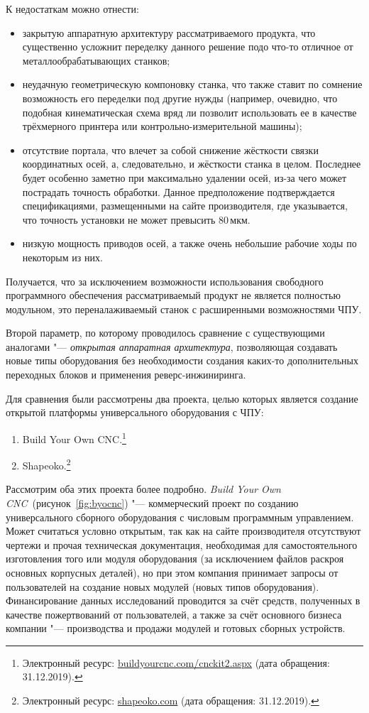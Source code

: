 К недостаткам можно отнести:

\begin{itemize}
	\item закрытую аппаратную архитектуру рассматриваемого продукта, что существенно усложнит переделку данного решение подо что-то отличное от металлообрабатывающих станков;
	\item неудачную геометрическую компоновку станка, что также ставит по сомнение возможность его переделки под другие нужды (например, очевидно, что подобная кинематическая схема вряд ли позволит использовать ее в качестве трёхмерного принтера или контрольно-измерительной машины);
	\item отсутствие портала, что влечет за собой снижение жёсткости связки координатных осей, а, следовательно, и жёсткости станка в целом. Последнее будет особенно заметно при максимально удалении осей, из-за чего может пострадать точность обработки. Данное предположение подтверждается спецификациями, размещенными на сайте производителя, где указывается, что точность установки не может превысить 80\,мкм.
	\item низкую мощность приводов осей, а также очень небольшие рабочие ходы по некоторым из них.
\end{itemize}

Получается, что за исключением возможности использования свободного программного обеспечения рассматриваемый продукт не является полностью модульном, это переналаживаемый станок с расширенными возможностями ЧПУ.

Второй параметр, по которому проводилось сравнение с существующими аналогами "--- \textit{открытая аппаратная архитектура}, позволяющая создавать новые типы оборудования без необходимости создания каких-то дополнительных переходных блоков и применения реверс-инжиниринга.

Для сравнения были рассмотрены два проекта, целью которых является создание открытой платформы универсального оборудования с ЧПУ:

\begin{enumerate}
	\item Build Your Own CNC.\footnote{Электронный ресурс: {\small\url{buildyourcnc.com/cnckit2.aspx}} (дата обращения: 31.12.2019).}
	\item Shapeoko.\footnote{Электронный ресурс: {\small\url{shapeoko.com}} (дата обращения: 31.12.2019).}
\end{enumerate}

Рассмотрим оба этих проекта более подробно. \textit{Build Your Own CNC}~(рисунок~\cref{fig:byocnc}) "--- коммерческий проект по созданию универсального сборного оборудования с числовым программным управлением. Может считаться условно открытым, так как на сайте производителя отсутствуют чертежи и прочая техническая документация, необходимая для самостоятельного изготовления того или модуля оборудования (за исключением файлов раскроя основных корпусных деталей), но при этом компания принимает запросы от пользователей на создание новых модулей (новых типов оборудования). Финансирование данных исследований проводится за счёт средств, полученных в качестве пожертвований от пользователей, а также за счёт основного бизнеса компании "--- производства и продажи модулей и готовых сборных устройств.

